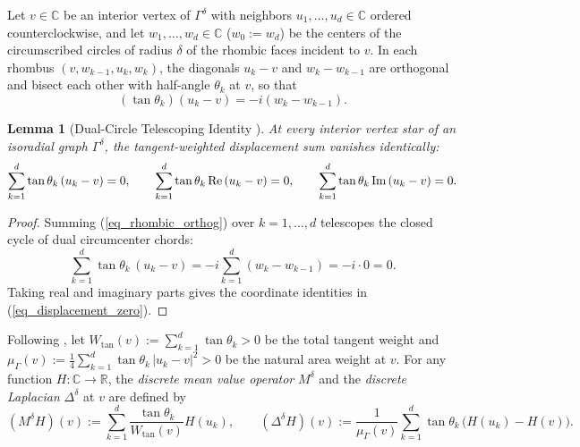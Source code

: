 \documentclass[11pt,reqno]{amsart}
\newtheorem{lem}[thm]{Lemma}
\numberwithin{equation}{section}
\newcommand{\R}{\mathbb{R}}
\newcommand{\C}{\mathbb{C}}
\newcommand{\re}{\mbox{\rm Re\,}}
\newcommand{\im}{\mbox{\rm Im\,}}
\begin{document}
Let $v \in \C$ be an interior vertex of $\varGamma^{\delta}$ with neighbors $u_1, \dots, u_d \in \C$ ordered counterclockwise, and let $w_1, \dots, w_d \in \C$ ($w_0 := w_d$) be the centers of the circumscribed circles of radius $\delta$ of the rhombic faces incident to $v$. In each rhombus $(v, w_{k-1}, u_k, w_k)$, the diagonals $u_k - v$ and $w_k - w_{k-1}$ are orthogonal and bisect each other with half-angle $\theta_k$ at $v$, so that
\begin{equation} \label{eq_rhombic_orthog}
  (\tan\theta_k)(u_k - v) = -i(w_k - w_{k-1}).
\end{equation}

\begin{lem}[Dual-Circle Telescoping Identity {\cite[p.~1594]{CS}}] \label{lem_dual_telescoping}
At every interior vertex star of an isoradial graph $\varGamma^{\delta}$, the tangent-weighted displacement sum vanishes identically:
\begin{equation} \label{eq_displacement_zero}
  \sum_{k=1}^d \tan\theta_k\,(u_k - v) = 0, \qquad
  \sum_{k=1}^d \tan\theta_k\,\re(u_k - v) = 0, \qquad
  \sum_{k=1}^d \tan\theta_k\,\im(u_k - v) = 0.
\end{equation}
\end{lem}
\begin{proof}
Summing (\ref{eq_rhombic_orthog}) over $k = 1, \dots, d$ telescopes the closed cycle of dual circumcenter chords:
\[
  \sum_{k=1}^d \tan\theta_k\,(u_k - v) = -i \sum_{k=1}^d (w_k - w_{k-1}) = -i \cdot 0 = 0.
\]
Taking real and imaginary parts gives the coordinate identities in (\ref{eq_displacement_zero}).
\end{proof}

Following \cite[Eq.~(2.1), p.~1593]{CS}, let $W_{\tan}(v) := \sum_{k=1}^d \tan\theta_k > 0$ be the total tangent weight and $\mu_{\varGamma}(v) := \frac{1}{4}\sum_{k=1}^d \tan\theta_k\,|u_k - v|^2 > 0$ be the natural area weight at $v$. For any function $H : \C \to \R$, the \emph{discrete mean value operator} $M^{\delta}$ and the \emph{discrete Laplacian} $\Delta^{\delta}$ at $v$ are defined by
\begin{equation} \label{eq_disc_lap_mvp}
  (M^{\delta} H)(v) := \sum_{k=1}^d \frac{\tan\theta_k}{W_{\tan}(v)} H(u_k), \qquad
  (\Delta^{\delta} H)(v) := \frac{1}{\mu_{\varGamma}(v)} \sum_{k=1}^d \tan\theta_k\,\bigl(H(u_k) - H(v)\bigr).
\end{equation}
\end{document}
